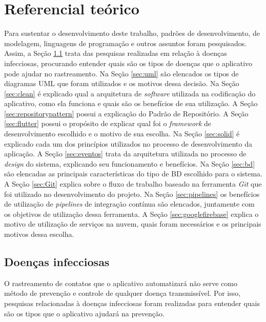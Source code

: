 \chapter{Referencial teórico}\label{chp:referencial}
Para sustentar o desenvolvimento deste trabalho, padrões de desenvolvimento, de modelagem, linguagens de programação e outros assuntos foram pesquisados. Assim, a Seção \ref{sec:infecciosas} trata das pesquisas realizadas em relação à doenças infecciosas, procurando entender quais são os tipos de doenças que o aplicativo pode ajudar no rastreamento. Na Seção \ref{sec:uml} são elencados os tipos de diagramas UML que foram utilizados e os motivos dessa decisão. Na Seção \ref{sec:clean} é explicado qual a arquitetura de \textit{software} utilizada na codificação do aplicativo, como ela funciona e quais são os benefícios de sua utilização. A Seção \ref{sec:repositorypattern} possui a explicação do Padrão de Repositório. A Seção \ref{sec:flutter} possui o propósito de explicar qual foi o \textit{framework} de desenvolvimento escolhido e o motivo de sua escolha. Na Seção \ref{sec:solid} é explicado cada um dos princípios utilizados no processo de desenvolvimento da aplicação. A Seção \ref{sec:eventos} trata da arquitetura utilizada no processo de \textit{design} do sistema, explicando seu funcionamento e benefícios. Na Seção \ref{sec:bd} são elencadas as principais características do tipo de BD escolhido para o sistema. A Seção \ref{sec:Git} explica sobre o fluxo de trabalho baseado na ferramenta \textit{Git} que foi utilizado no desenvolvimento do projeto. Na Seção \ref{sec:pipelines} os benefícios de utilização de \textit{pipelines} de integração contínua são elencados, juntamente com os objetivos de utilização dessa ferramenta. A Seção \ref{sec:googlefirebase} explica o motivo de utilização de serviços na nuvem, quais foram necessários e os principais motivos dessa escolha.

\section{Doenças infecciosas}\label{sec:infecciosas}
O rastreamento de contatos que o aplicativo automatizará não serve como método de prevenção e controle de qualquer doença transmissível. Por isso, pesquisas relacionadas à doenças infecciosas foram realizadas para entender quais são os tipos que o aplicativo ajudará na prevenção.

